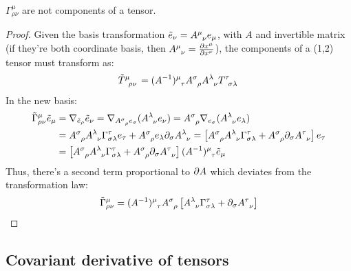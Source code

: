 \begin{proposition}\label{gamma-non-tens}
  $ \Gamma^\mu_{\rho \nu} $ are not components of a tensor.
\end{proposition}
\begin{proof}
  Given the basis transformation $ \tilde{e}_\nu = \tensor{A}{^\mu _\nu} e_\mu $, with $ A $ and invertible matrix (if they're both coordinate basis, then $ \tensor{A}{^\mu _\nu} = \frac{\pa x^\mu}{\pa x^\nu} $), the components of a (1,2) tensor must transform as:
  \begin{equation*}
    \tensor{\tilde{T}}{^\mu _\rho _\nu} = \tensor{(A^{-1})}{^\mu _\tau} \tensor{A}{^\sigma _\rho} \tensor{A}{^\lambda _\nu} \tensor{T}{^\tau _\sigma _\lambda}
  \end{equation*}
  In the new basis:
  \begin{equation*}
    \begin{split}
      \tilde{\Gamma}^\mu_{\rho \nu} \tilde{e}_\mu
      &= \na_{\tilde{e}_\rho}\tilde{e}_\nu = \na_{\tensor{A}{^\sigma _\rho} e_\sigma} (\tensor{A}{^\lambda _\nu} e_{\nu}) = \tensor{A}{^\sigma _\rho} \na_{e_\sigma} (\tensor{A}{^\lambda _\nu} e_\lambda) \\
      &= \tensor{A}{^\sigma _\rho} \tensor{A}{^\lambda _\nu} \Gamma^\tau_{\sigma \lambda} e_\tau + \tensor{A}{^\sigma _\rho} e_\lambda \pa_\sigma \tensor{A}{^\lambda _\nu} = \left[ \tensor{A}{^\sigma _\rho} \tensor{A}{^\lambda _\nu} \Gamma^\tau_{\sigma \lambda} + \tensor{A}{^\sigma _\rho} \pa_\sigma \tensor{A}{^\tau _\nu} \right] e_\tau \\
      &= \left[ \tensor{A}{^\sigma _\rho} \tensor{A}{^\lambda _\nu} \Gamma^\tau_{\sigma \lambda} + \tensor{A}{^\sigma _\rho} \pa_\sigma \tensor{A}{^\tau _\nu} \right] \tensor{(A^{-1})}{^\mu _\tau} \tilde{e}_\mu
    \end{split}
  \end{equation*}
  Thus, there's a second term proportional to $ \partial A $ which deviates from the transformation law:
  \begin{equation*}
    \tilde{\Gamma}^\mu_{\rho \nu} = \tensor{(A^{-1})}{^\mu _\tau} \tensor{A}{^\sigma _\rho} \left[ \tensor{A}{^\lambda _\nu} \Gamma^\tau_{\sigma \lambda} + \pa_\sigma \tensor{A}{^\tau _\nu} \right]
  \end{equation*}
\end{proof}

\subsection{Covariant derivative of tensors}

